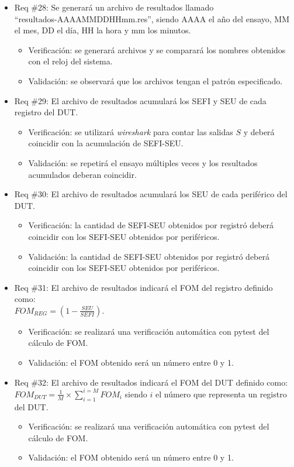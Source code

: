 \documentclass[
11pt, %
]{charter}
\begin{document}
\begin{itemize}
\item Req \#28: Se generará un archivo de resultados llamado\\ ``resultados-AAAAMMDDHHmm.res'', siendo AAAA el año del ensayo, MM el mes, DD el día, HH la hora y mm los minutos.
\begin{itemize}
    \item Verificación: se generará archivos y se comparará los nombres obtenidos con el reloj del sistema.
    \item Validación: se observará que los archivos tengan el patrón especificado.
\end{itemize}

\item Req \#29: El archivo de resultados acumulará los SEFI y SEU de cada registro del DUT.
\begin{itemize}
    \item Verificación: se utilizará \emph{wireshark} para contar las salidas $ S $ y deberá coincidir con la acumulación de SEFI-SEU.
    \item Validación: se repetirá el ensayo múltiples veces y los resultados acumulados deberan coincidir.
\end{itemize}

\item Req \#30: El archivo de resultados acumulará los SEU de cada periférico del DUT.
\begin{itemize}
    \item Verificación: la cantidad de SEFI-SEU obtenidos por registró deberá coincidir con los SEFI-SEU obtenidos por periféricos.
    \item Validación: la cantidad de SEFI-SEU obtenidos por registró deberá coincidir con los SEFI-SEU obtenidos por periféricos.
\end{itemize}

\item Req \#31: El archivo de resultados indicará el FOM del registro definido como: \\ $ FOM_{REG} = (1 - \frac{SEU}{SEFI}) $.
\begin{itemize}
    \item Verificación: se realizará una verificación automática con pytest del cálculo de FOM.
    \item Validación: el FOM obtenido será un número entre 0 y 1.
\end{itemize}

\item Req \#32: El archivo de resultados indicará el FOM del DUT definido como: \\ $ FOM_{DUT} = \frac{1}{M} \times \sum_{i = 1}^{i = M}FOM_{i} $ siendo $ i $ el número que representa un registro del DUT.
\begin{itemize}
    \item Verificación: se realizará una verificación automática con pytest del cálculo de FOM.
    \item Validación: el FOM obtenido será un número entre 0 y 1.
\end{itemize}


\end{itemize}
\end{document}
